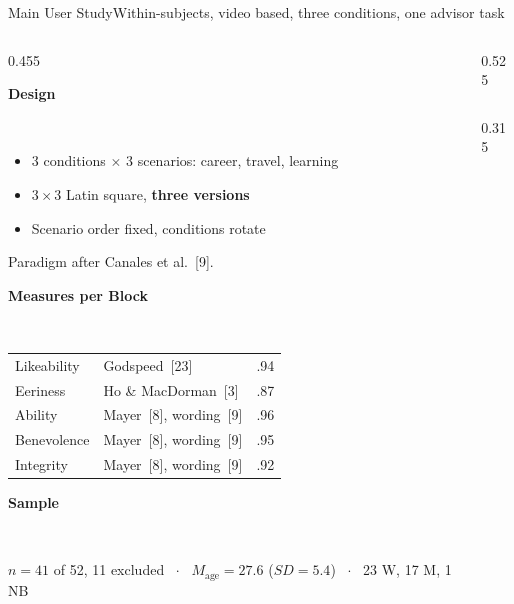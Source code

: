 \documentclass[aspectratio=169,10pt]{beamer}
\newcommand{\hl}[1]{{\color{knblue}\textbf{#1}}}
\newcommand{\panelhead}[1]{\noindent\colorbox{kncyan}{\parbox{0.96\textwidth}{\centering\vspace{1pt}\color{white}\scriptsize\bfseries #1\vspace{1pt}}}\\[0.25em]}
\newcommand{\panelheadsm}[1]{\noindent\colorbox{kncyan}{\parbox{0.96\textwidth}{\centering\vspace{1pt}\color{white}\tiny\bfseries #1\vspace{1pt}}}\\[0.2em]}
\newcommand{\panel}[1]{\noindent\colorbox{knlight}{\parbox{0.96\textwidth}{\vspace{2pt}\scriptsize
\begin{itemize}\setlength{\itemsep}{0.2em}\setlength{\leftmargini}{1.1em}#1\end{itemize}\vspace{2pt}}}}
\begin{document}
\begin{frame}{Main User Study}{Within-subjects, video based, three conditions, one advisor task}
  \vspace{0.15em}
  \begin{columns}[T]
    \begin{column}{0.455\textwidth}
      \panelhead{Design}
      \panel{%
        \item 3 conditions $\times$ 3 scenarios: career, travel, learning
        \item $3\times3$ Latin square, \hl{three versions}
        \item Scenario order fixed, conditions rotate}
      \vspace{0.15em}
      {\tiny\color{kngrey}Paradigm after Canales et al.~[9].\par}
      \vspace{0.25em}
      \panelhead{Measures per Block}
      \noindent\colorbox{knlight}{\parbox{0.96\textwidth}{\vspace{2pt}\tiny
      \setlength{\tabcolsep}{2.5pt}\renewcommand{\arraystretch}{1.2}
      \begin{tabular}{@{}>{\raggedright\arraybackslash}m{}>{\raggedright\arraybackslash}m{}>{\raggedleft\arraybackslash}m{}@{}}
        Likeability & Godspeed~[23] & .94 \\
        Eeriness    & Ho \& MacDorman~[3] & .87 \\
        Ability     & Mayer~[8], wording~[9] & .96 \\
        Benevolence & Mayer~[8], wording~[9] & .95 \\
        Integrity   & Mayer~[8], wording~[9] & .92 \\
      \end{tabular}\vspace{2pt}}}
      \vspace{0.35em}
      \panelheadsm{Sample}
      \noindent\colorbox{knlight}{\parbox{0.96\textwidth}{\vspace{2pt}\tiny\color{kngrey}
      \textbf{\color{knblue}$n=41$} of 52, 11 excluded \ $\cdot$ \ $M_{\text{age}} = 27.6$ ($SD = 5.4$) \ $\cdot$ \ 23 W, 17 M, 1 NB\vspace{2pt}}}
    \end{column}
    \begin{column}{0.525\textwidth}
      \begin{columns}[T]
        \begin{column}{0.315\textwidth}\centering

\end{column}
\end{columns}
\end{column}
\end{columns}
\end{frame}
\end{document}
